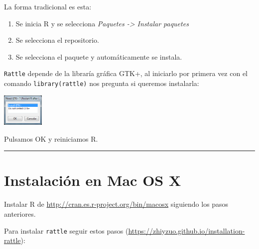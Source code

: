\documentclass[
]{book}
\begin{document}
La forma tradicional es esta:

\begin{enumerate}
\def\labelenumi{\arabic{enumi}.}
\item
  Se inicia R y se selecciona \emph{Paquetes -\textgreater{} Instalar paquetes}
\item
  Se selecciona el repositorio.
\item
  Se selecciona el paquete y automáticamente se instala.
\end{enumerate}

\texttt{Rattle} depende de la libraría gráfica GTK+, al iniciarlo por primera vez
con el comando \texttt{library(rattle)} nos pregunta si queremos instalarla:

\includegraphics[width=0.15\textwidth,height=\textheight]{images/image7.png}

Pulsamos OK y reiniciamos R.

\begin{center}\rule{0.5\linewidth}{0.5pt}\end{center}

\hypertarget{instalaciuxf3n-en-mac-os-x}{%
\section{Instalación en Mac OS X}\label{instalaciuxf3n-en-mac-os-x}}

Instalar R de
\url{http://cran.es.r‐project.org/bin/macosx}
siguiendo los pasos anteriores.

Para instalar \texttt{rattle} seguir estos pasos (\url{https://zhiyzuo.github.io/installation-rattle}):
\end{document}

